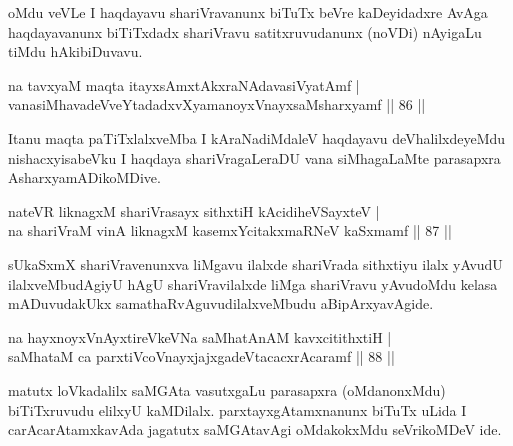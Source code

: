 \begin{artha}
oMdu veVLe I haqdayavu shariVravanunx biTuTx beVre kaDeyidadxre AvAga haqdayavanunx biTiTxdadx shariVravu satitxruvudanunx (noVDi) nAyigaLu tiMdu hAkibiDuvavu.
\end{artha}


\begin{shl}
na tavxyaM maqta itayxsAmxtAkxraNAdavasiVyatAmf |\\
vanasiMhavadeVveYtadadxvXyamanoyxVnayxsaMsharxyamf \hfill || 86 ||
\end{shl}

\begin{artha}%
Itanu maqta paTiTxlalxveMba I kAraNadiMdaleV haqdayavu deVhalilxdeyeMdu nishacxyisabeVku I haqdaya shariVragaLeraDU vana siMhagaLaMte parasapxra AsharxyamADikoMDive.
\end{artha}


\begin{shl}
nateVR liknagxM shariVrasayx sithxtiH kAcidiheVSayxteV |\\
na shariVraM vinA liknagxM kasemxYcitakxmaRNeV kaSxmamf \hfill || 87 ||
\end{shl}

\begin{artha}
sUkaSxmX shariVravenunxva liMgavu ilalxde shariVrada sithxtiyu ilalx yAvudU ilalxveMbudAgiyU hAgU shariVravilalxde liMga shariVravu yAvudoMdu kelasa mADuvudakUkx samathaRvAguvudilalxveMbudu aBipArxyavAgide.
\end{artha}

\begin{shl}
na hayxnoyxVnAyxtireVkeVNa saMhatAnAM kavxcitithxtiH |\\
saMhataM ca parxtiVcoV\s nayxjajxgadeVtacacxrAcaramf \hfill || 88 ||
\end{shl}

\begin{artha}
matutx loVkadalilx saMGAta vasutxgaLu parasapxra (oMdanonxMdu) biTiTxruvudu elilxyU kaMDilalx. parxtayxgAtamxnanunx biTuTx uLida I carAcarAtamxkavAda jagatutx saMGAtavAgi oMdakokxMdu seVrikoMDeV ide.
\end{artha}



